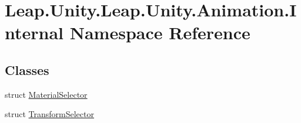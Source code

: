 \hypertarget{namespace_leap_1_1_unity_1_1_leap_1_1_unity_1_1_animation_1_1_internal}{}\section{Leap.\+Unity.\+Leap.\+Unity.\+Animation.\+Internal Namespace Reference}
\label{namespace_leap_1_1_unity_1_1_leap_1_1_unity_1_1_animation_1_1_internal}
\subsection*{Classes}
\begin{DoxyCompactItemize}
\item 
struct \mbox{\hyperlink{struct_leap_1_1_unity_1_1_leap_1_1_unity_1_1_animation_1_1_internal_1_1_material_selector}{Material\+Selector}}
\item 
struct \mbox{\hyperlink{struct_leap_1_1_unity_1_1_leap_1_1_unity_1_1_animation_1_1_internal_1_1_transform_selector}{Transform\+Selector}}
\end{DoxyCompactItemize}
